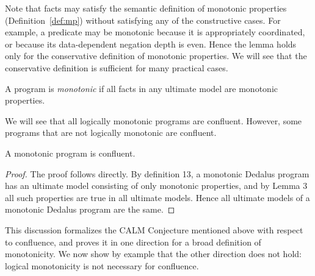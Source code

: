 
Note that facts may satisfy the semantic definition of monotonic 
properties  (Definition~\ref{def:mp})  without satisfying any of the constructive cases.  For example, a predicate may
be monotonic because it is appropriately coordinated, or because its data-dependent
negation depth is even.
Hence the lemma holds only for the conservative definition of monotonic properties.  We will 
see that the conservative definition is sufficient for many practical cases.  

\begin{definition}
A \lang program is {\em monotonic} if all facts in any ultimate model are monotonic properties.  
\end{definition}

We will see that all logically monotonic programs are confluent.  However, some programs that are not logically monotonic are confluent.

\begin{theorem}
A monotonic \lang program is confluent.
\end{theorem}
\begin{proof}
\begin{comment}
Proof sketch: If a particular ultimate model is populated by atoms that depend only on monotonic properties, then those atoms occur in any ultimate model of the program.  If all ultimate models
are populated in such a way, they are indeed all the same, unique ultimate model.  
\jmh{
\end{comment}
The proof follows directly.  By definition 13, a monotonic Dedalus program has an ultimate model consisting of only monotonic properties, and by Lemma 3 all such properties are true in all ultimate models.  Hence all ultimate models of a monotonic Dedalus program are the same.
\end{proof}

This discussion formalizes the CALM Conjecture mentioned above with respect to confluence, and proves it in one direction for a broad definition of monotonicity.  
We now show by example that the other direction does not hold: logical monotonicity is not necessary for confluence.

